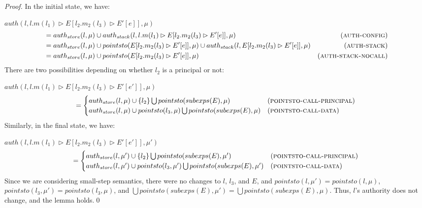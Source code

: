 \documentclass{llncs}
\begin{document}
\begin{proof} In the initial state, we have:

\noindent$auth(l, l.m(l_1) \rhd E[l_2.m_2(l_3) \rhd E'[e]], \mu)$
\vspace{-7pt}
\begin{align*}
&= auth_{store}(l, \mu) \cup auth_{stack}(l, l.m(l_1) \rhd E[l_2.m_2(l_3) \rhd E'[e]], \mu) & (\textsc{auth-config})\\
&= auth_{store}(l, \mu) \cup pointsto(E[l_2.m_2(l_3) \rhd E'[e]], \mu) \cup auth_{stack}(l, E[l_2.m_2(l_3) \rhd E'[e]], \mu) & (\textsc{auth-stack})\\
&= auth_{store}(l, \mu) \cup pointsto(E[l_2.m_2(l_3) \rhd E'[e]], \mu) & (\textsc{auth-stack-nocall})
\end{align*}
There are two possibilities depending on whether $l_2$ is a principal or not:

\noindent$auth(l, l.m(l_1) \rhd E[l_2.m_2(l_3) \rhd E'[e']], \mu)$
\vspace{-7pt}
\[
= 
\begin{cases}
    auth_{store}(l, \mu) \cup \{ l_2 \} \bigcup pointsto(subexps(E), \mu) & (\textsc{pointsto-call-principal})\\
    auth_{store}(l, \mu) \cup pointsto(l_3, \mu) \bigcup pointsto(subexps(E), \mu) & (\textsc{pointsto-call-data})
\end{cases}
\]Similarly, in the final state, we have:

\noindent$auth(l, l.m(l_1) \rhd E[l_2.m_2(l_3) \rhd E'[e']], \mu')$
\vspace{-7pt}
\[
= 
\begin{cases}
    auth_{store}(l, \mu') \cup \{ l_2 \} \bigcup pointsto(subexps(E), \mu') & (\textsc{pointsto-call-principal})\\
    auth_{store}(l, \mu') \cup pointsto(l_3, \mu') \bigcup pointsto(subexps(E), \mu') & (\textsc{pointsto-call-data})
\end{cases}
\]
Since we are considering small-step semantics, there were no changes to $l$, $l_3$, and $E$, and $pointsto(l, \mu') = pointsto(l, \mu)$, $pointsto(l_3, \mu') = pointsto(l_3, \mu)$, and $\bigcup pointsto(subexps(E), \mu') = \bigcup pointsto(subexps(E), \mu)$. Thus, $l$'s authority does not change, and the lemma holds.\qed

\end{proof}
\end{document}
